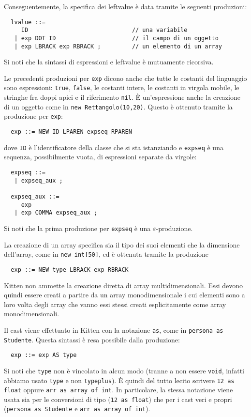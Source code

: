 %
Conseguentemente, la specifica dei leftvalue \`e data tramite le seguenti
produzioni:
%
\begin{verbatim}
  lvalue ::=
     ID                              // una variabile
   | exp DOT ID                      // il campo di un oggetto
   | exp LBRACK exp RBRACK ;         // un elemento di un array
\end{verbatim}
%
Si noti che la sintassi di espressioni e leftvalue \`e mutuamente ricorsiva.

Le precedenti produzioni per \texttt{exp} dicono anche
che tutte le costanti del linguaggio sono espressioni:
\cioe \texttt{true}, \texttt{false}, le costanti intere, le costanti in virgola
mobile, le stringhe fra doppi apici e il riferimento \texttt{nil}.
\`E un'espressione anche la creazione di un oggetto come in
\texttt{new Rettangolo(10,20)}. Questo \`e ottenuto tramite la
produzione per \texttt{exp}:
%
\begin{verbatim}
  exp ::= NEW ID LPAREN expseq RPAREN
\end{verbatim}
%
dove \texttt{ID} \`e l'identificatore della classe che si sta istanziando
e \texttt{expseq} \`e una sequenza, possibilmente vuota, di espressioni
separate da virgole:
%
\begin{verbatim}
  expseq ::=
   | expseq_aux ;

  expseq_aux ::=
     exp
   | exp COMMA expseq_aux ;
\end{verbatim}
%
Si noti che la prima produzione per \texttt{expseq}
\`e una $\varepsilon$-produzione.

La creazione di un array specifica sia il tipo dei suoi elementi che la
dimensione dell'array, come in \texttt{new int[50]}, ed \`e ottenuta tramite
la produzione
%
\begin{verbatim}
  exp ::= NEW type LBRACK exp RBRACK
\end{verbatim}
%
Kitten non ammette la creazione diretta di array multidimensionali. Essi devono
quindi essere creati a partire da un array monodimensionale i cui elementi
sono a loro volta degli array che vanno essi stessi
creati esplicitamente come array monodimensionali.

Il cast viene effettuato in Kitten con la notazione \texttt{as}, come in
\texttt{persona as Studente}. Questa sintassi \`e resa possibile dalla
produzione:
%
\begin{verbatim}
  exp ::= exp AS type
\end{verbatim}
%
Si noti che \texttt{type} non \`e vincolato in alcun modo (tranne a non essere
\texttt{void}, infatti abbiamo usato \texttt{type} e non \texttt{typeplus}).
\`E quindi del tutto lecito scrivere \texttt{12 as float} oppure
\texttt{arr as array of int}. In particolare, la stessa notazione viene
usata sia per le conversioni di tipo (\texttt{12 as float}) che per
i cast veri e propri (\texttt{persona as Studente} e
\texttt{arr as array of int}).

